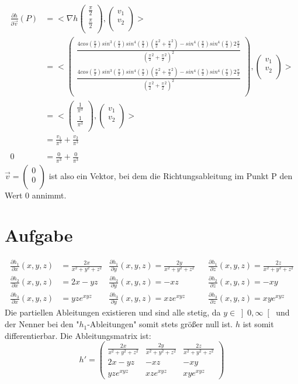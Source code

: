 \documentclass[10pt,a4paper,parskip=half]{scrartcl}
\newcommand{\vectwo}[2]{\left(\begin {array} {c}#1\\#2\\\end {array} \right)}
\begin{document}
\begin{enumerate}[(i)]
\begin{align*}
\frac{\partial h}{\partial \vec v} (P) &= < \nabla h \vectwo{\frac{\pi}{2}}{\frac{\pi}{2}}, \vectwo{v_1}{v_2} >\\
 &= < \vectwo{\frac{4cos(\frac{\pi}{2})sin^3(\frac{\pi}{2})sin^4(\frac{\pi}{2})(\frac{\pi}{2}^2 + \frac{\pi}{2}^2) - sin^4(\frac{\pi}{2})sin^4(\frac{\pi}{2})2\frac{\pi}{2}}{(\frac{\pi}{2}^2 + \frac{\pi}{2}^2)^2}}{\frac{4cos(\frac{\pi}{2})sin^3(\frac{\pi}{2})sin^4(\frac{\pi}{2})(\frac{\pi}{2}^2 + \frac{\pi}{2}^2) - sin^4(\frac{\pi}{2})sin^4(\frac{\pi}{2})2\frac{\pi}{2}}{(\frac{\pi}{2}^2 + \frac{\pi}{2}^2)^2}}, \vectwo{v_1}{v_2} >\\
 &= < \vectwo{\frac{1}{\pi^3}}{\frac{1}{\pi^3}}, \vectwo{v_1}{v_2} > \\
 &= \frac{v_1}{\pi^3} + \frac{v_2}{\pi^3} \\ \\
 0 &= \frac{0}{\pi^3} + \frac{0}{\pi^3}
\end{align*}
$\vec v = \vectwo{0}{0}$ ist also ein Vektor, bei dem die Richtungsableitung im Punkt P den Wert 0 annimmt.

\section{Aufgabe}
\begin{align*}
\frac{\partial h_1}{\partial x}(x,y,z) &= \frac {2x}{x^2+y^2+z^2} &\frac{\partial h_1}{\partial y}(x,y,z) = \frac{2y}{x^2+y^2+z^2} &&\frac{\partial h_1}{\partial z}(x,y,z) = \frac{2z}{x^2+y^2+z^2}\\
\frac{\partial h_2}{\partial x}(x,y,z) &= 2x-yz &\frac{\partial h_2}{\partial y}(x,y,z) = -xz &&\frac{\partial h_2}{\partial z}(x,y,z) = -xy\\
\frac{\partial h_3}{\partial x}(x,y,z) &= yze^{xyz} &\frac{\partial h_3}{\partial y}(x,y,z) = xze^{xyz} &&\frac{\partial h_3}{\partial z}(x,y,z) = xye^{xyz}
\end{align*}
Die partiellen Ableitungen existieren und sind alle stetig, da $y \in \left]0,\infty\right[$ und der Nenner bei den "$h_1$-Ableitungen" somit stets größer null ist. $h$ ist somit differentierbar.
Die Ableitungsmatrix ist:
$$h' =\begin{pmatrix}
\frac{2x}{x^2 + y^2 + z^2} & \frac{2y}{x^2 + y^2 + z^2} & \frac{2z}{x^2 + y^2 + z^2} \\
2x - yz & -xz & -xy \\
yze^{xyz}  & xze^{xyz} & xye^{xyz} 
\end{pmatrix}  $$


\end{enumerate}
\end{document}
